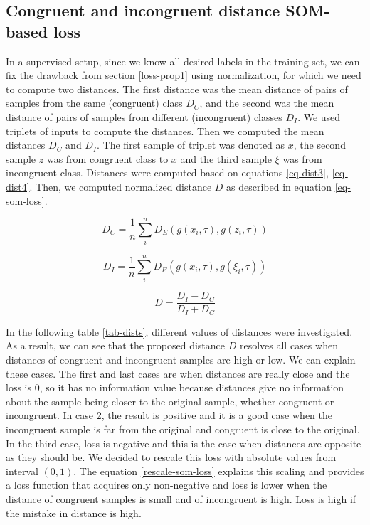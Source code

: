 \subsection{Congruent and incongruent distance SOM-based loss}
\label{loss-final}
In a supervised setup, since we know all desired labels in the training set, we can fix the drawback from section \ref{loss-prop1} using normalization, for which we need to compute two distances. The first distance was the mean distance of pairs of samples from the same (congruent) class $D_C$, and the second was the mean distance of pairs of samples from different (incongruent) classes $D_I$. We used triplets of inputs to compute the distances. Then we computed the mean distances $D_C$ and $D_I$. The first sample of triplet was denoted as $x$, the second sample $z$ was from congruent class to $x$ and the third sample $\xi$ was from incongruent class. Distances were computed based on equations \ref{eq-dist3}, \ref{eq-dist4}. Then, we computed normalized distance $D$ as described in equation \ref{eq-som-loss}.

\begin{equation}
    D_C = \frac{1}{n} \sum_i^n D_E(g(x_i, \tau), g(z_i, \tau)) 
    \label{eq-dist3}
\end{equation}

\begin{equation}
    D_I = \frac{1}{n} \sum_i^n D_E(g(x_i, \tau), g(\xi_i, \tau)) 
    \label{eq-dist4}
\end{equation}

\begin{equation}
    D = \frac{D_I - D_C}{D_I + D_C}
    \label{eq-som-loss}
\end{equation}

In the following table \ref{tab-dists}, different values of distances were investigated. As a result, we can see that the proposed distance $D$ resolves all cases when distances of congruent and incongruent samples are high or low.
We can explain these cases. The first and last cases are when distances are really close and the loss is 0, so it has no information value because distances give no information about the sample being closer to the original sample, whether congruent or incongruent. In case 2, the result is positive and it is a good case when the incongruent sample is far from the original and congruent is close to the original. In the third case, loss is negative and this is the case when distances are opposite as they should be. We decided to rescale this loss with absolute values from interval $(0, 1)$. The equation \ref{rescale-som-loss} explains this scaling and provides a loss function that acquires only non-negative and loss is lower when the distance of congruent samples is small and of incongruent is high. Loss is high if the mistake in distance is high.

